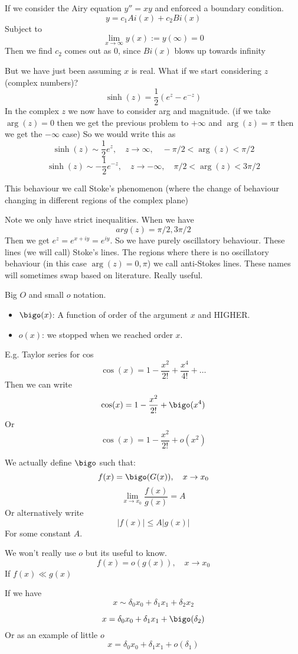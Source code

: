 \documentclass{/home/janmebows/Documents/LatexTemplates/myassignment}
\begin{document}
If we consider the Airy equation $y'' = xy$ and enforced a boundary condition.
\[y = c_1 Ai(x) + c_2 Bi(x)\]
Subject to
\[\lim_{x\to\infty} y(x) :=y(\infty) = 0\]
Then we find $c_2$ comes out as $0$, since $Bi(x)$ blows up towards infinity


But we have just been assuming $x$ is real. What if we start considering $z$ (complex numbers)?
\[\sinh(z) = \frac12 (e^{z} - e^{-z})\]
In the complex $z$ we now have to consider arg and magnitude.
(if we take $\arg(z) = 0$ then we get the previous problem to $+\infty$ and $\arg(z)=\pi$ then we get the $-\infty$ case)
So we would write this as
\[\sinh(z) \sim \frac12 e^{z}, \quad z\to \infty,\quad  -\pi/2 <\arg(z) < \pi/2 \]
\[\sinh(z) \sim -\frac12 e^{-z}, \quad z\to -\infty,\quad  \pi/2 <\arg(z) < 3\pi/2 \]

This behaviour we call Stoke's phenomenon (where the change of behaviour changing in different regions of the complex plane)

Note we only have strict inequalities. When we have \[arg(z) = \pi/2, 3\pi/2\]
Then we get $e^{z} = e^{x+iy} = e^{iy}$. So we have purely oscillatory behaviour. These lines (we will call) Stoke's lines. The regions where there is no oscillatory behaviour (in this case $\arg(z) = 0,\pi$) we call anti-Stokes lines.
These names will sometimes swap based on literature. Really useful.


Big $O$ and small $o$ notation.
\begin{itemize}
    \item $\bigo(x)$: A function of order of the argument $x$ and HIGHER. 
    \item $o(x)$: we stopped when we reached order $x$. 
\end{itemize}
E.g. Taylor series for cos
\[\cos(x) = 1 - \frac{x^2}{2!} + \frac{x^4}{4!} + \hdots\]
Then we can write
\[\cos(x) = 1 - \frac{x^2}{2!} + \bigo(x^4)\]
Or
\[\cos(x) = 1 - \frac{x^2}{2!} + o(x^2)\]

We actually define $\bigo$ such that:
\[f(x) = \bigo(G(x)), \quad x\to x_0\]
\[\lim_{x\to x_0} \frac{f(x)}{g(x)} = A\]
Or alternatively write
\[|f(x)| \leq A |g(x)|\]
For some constant $A$.

We won't really use $o$ but its useful to know.
\[f(x) = o(g(x)), \quad x\to x_0\]
If $f(x) \ll g(x)$

If we have
\[x \sim \delta_0 x_0 + \delta_1 x_1 + \delta_2 x_2\]


\[x = \delta_0 x_0 + \delta_1 x_1 + \bigo(\delta_2)\]
Or as an example of little $o$
\[x = \delta_0 x_0 + \delta_1 x_1 + o(\delta_1)\]
\end{document}
